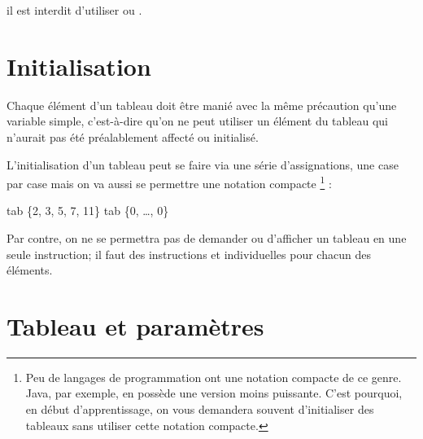 		il est interdit d’utiliser  ou
		. 
	
	\section{Initialisation}

		Chaque élément d'un tableau
		doit être manié avec la même précaution 
		qu’une variable simple, 
		c’est-à-dire qu’on ne peut utiliser un élément du tableau 
		qui n’aurait pas été préalablement affecté ou initialisé.

		L'initialisation d'un tableau peut se faire 
		via une série d'assignations, une case par case
		mais on va aussi se permettre une notation compacte%
		\footnote{
			Peu de langages de programmation 
			ont une notation compacte de ce genre. 
			Java, par exemple, en possède une version moins puissante.
			C'est pourquoi, en début d'apprentissage, 
			on vous demandera souvent d'initialiser des tableaux
			sans utiliser cette notation compacte.
		} :
		
		\begin{LDA}
			\Let tab \Gets \{2, 3, 5, 7, 11\} 
			\Let tab \Gets \{0, \dots, 0\} 
		\end{LDA}

		Par contre, on ne se permettra pas de demander ou d'afficher 
		un tableau en une seule instruction; 
		il faut des instructions  
		et 
		individuelles pour chacun des éléments.
		
	\section{Tableau et paramètres}
	
